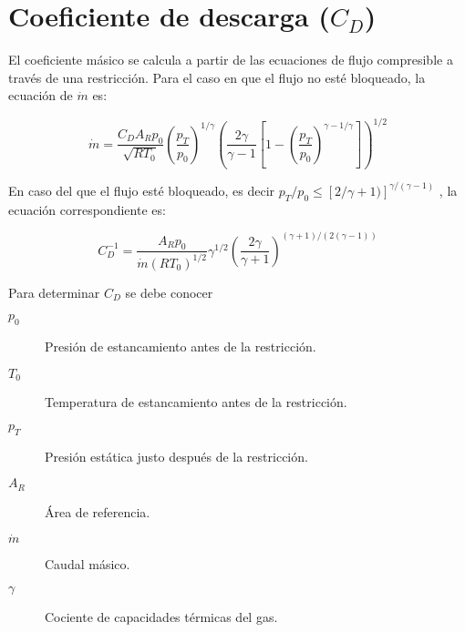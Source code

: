 
\section{Coeficiente de descarga ($C_D$)}

El coeficiente másico se calcula a partir de las ecuaciones de flujo compresible
a través de una restricción.
%
Para el caso en que el flujo no esté bloqueado, la ecuación de $\dot{m}$ es:

\begin{equation}
   \label{eq:m_not_choked}
   \dot{m} = \frac{C_D A_R p_0}{\sqrt{R T_0}}
             {\left(\frac{p_T}{p_0} \right)}^{1/\gamma}
             {\left( \frac{2\gamma}{\gamma-1} \left[1- {(\frac{p_T}{p_0})}^{{\gamma-1}/\gamma} \right] \right)} ^{1/2}
\end{equation}

En caso del que el flujo esté bloqueado, es decir
$p_T/p_0 \le [2/\gamma+1)]^{\gamma/(\gamma - 1)}$
, la ecuación correspondiente es:

\begin{equation}
C_D^{-1} =  \frac {A_R p_0} {\dot{m} (R T_0)^{1/2}}
            \gamma^{1/2}
            \left( \frac{2\gamma}{\gamma+1} \right)^{(\gamma+1)/(2(\gamma-1))}
\end{equation}

Para determinar $C_D$ se debe conocer

\begin{description}
    \item[$p_0$] Presión de estancamiento antes de la restricción.
    \item[$T_0$] Temperatura de estancamiento antes de la restricción.
    \item[$p_T$] Presión estática justo después de la restricción.
    \item[$A_R$] Área de referencia.
    \item[$\dot{m}$] Caudal másico.
    \item[$\gamma$] Cociente de capacidades térmicas del gas.
\end{description}

